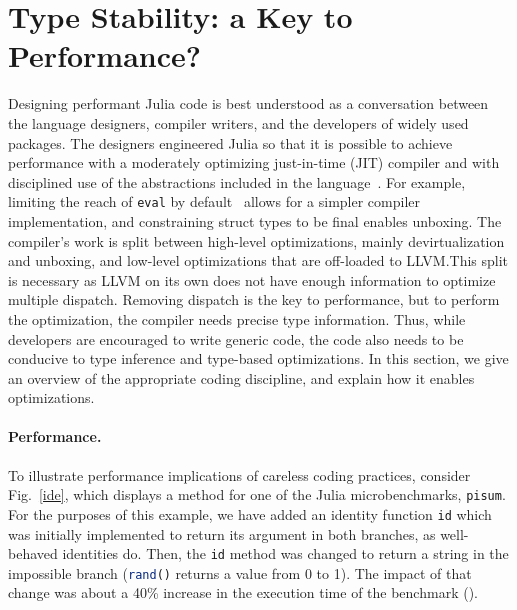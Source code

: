 \documentclass[oneside,openright,titlepage,numbers=noenddot,%
headinclude,footinclude,cleardoublepage=empty,abstract=on,
BCOR=5mm,paper=a4,fontsize=11pt,
dvipsnames
]{scrreprt}
\renewcommand{\c}[1]{\lstinline[language=Julia]!#1!\xspace}
\begin{document}
\section{Type Stability: a Key to Performance?}\label{sec:stability}

Designing performant Julia code is best understood as a conversation between the
language designers, compiler writers, and the developers of widely used
packages. The designers engineered Julia so that it is possible to achieve
performance with a moderately optimizing just-in-time (JIT) compiler
and with disciplined use of the abstractions included in the language~\cite{oopsla18a}.
For example, limiting the reach of \c{eval} by default~\cite{oopsla20a} allows
for a simpler compiler implementation,
and constraining struct types to be final enables unboxing.
The compiler's work is split between high-level optimizations, mainly
devirtualization and unboxing, and low-level optimizations that are off-loaded
to LLVM.\@ This split is necessary as LLVM on its own does not have enough
information to optimize multiple dispatch.
Removing dispatch is the key to performance, but to perform the optimization,
the compiler needs precise type information. Thus, while developers
are encouraged to write generic code, the code also needs to be conducive
to type inference and type-based optimizations. In this section,
we give an overview of the appropriate coding discipline, and explain
how it enables optimizations.


\paragraph{Performance.} To illustrate performance implications of careless
coding practices, consider Fig.~\ref{ide}, which displays a method for one of
the Julia microbenchmarks, \c{pisum}. For the purposes of this example, we
have added an identity function \c{id} which was initially implemented to
return its argument in both branches, as well-behaved identities do.
Then, the \c{id} method was changed to return a string in the impossible
branch (\c{rand()} returns a value from 0 to 1). The impact of that change
was about a 40\% increase in the execution time of the benchmark (\juliaversion).

\end{document}
